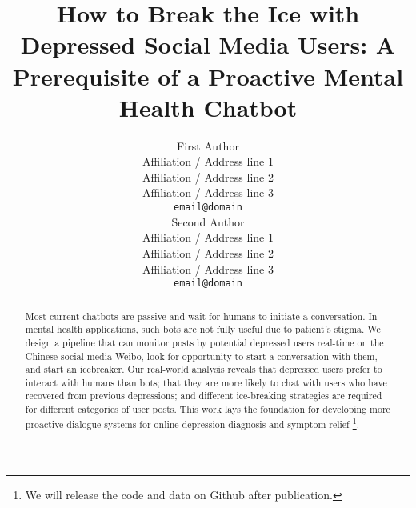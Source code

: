 \documentclass[11pt]{article}
\title{How to Break the Ice with Depressed Social Media Users: A Prerequisite of a Proactive Mental Health Chatbot}
\author{First Author \\
  Affiliation / Address line 1 \\
  Affiliation / Address line 2 \\
  Affiliation / Address line 3 \\
  \texttt{email@domain} \\\And
  Second Author \\
  Affiliation / Address line 1 \\
  Affiliation / Address line 2 \\
  Affiliation / Address line 3 \\
  \texttt{email@domain} \\}
\begin{document}
\maketitle
\begin{abstract}
Most current chatbots are passive and wait for humans to initiate a conversation.
In mental health applications, such bots are not fully useful due to patient's stigma. 
We design a pipeline that can monitor posts by potential depressed users real-time on the Chinese social media Weibo, 
look for opportunity to start a conversation with them, and start an icebreaker.
Our real-world analysis reveals that depressed users prefer to interact with humans than bots; 
that they are more likely to chat with users who have recovered from previous depressions; 
and different ice-breaking strategies are required for different categories of user posts.
This work lays the foundation for developing more proactive dialogue
systems for online depression diagnosis and symptom relief \footnote{We will release the code and data on Github after publication.}. 
\end{abstract}













\appendix

\end{document}
